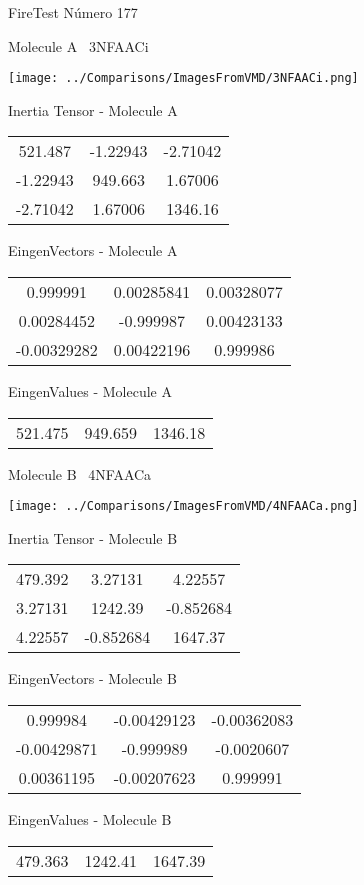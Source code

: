 \vtab[-3cm]
\begin{center}
{\large FireTest \tab Número 177}
\end{center}
\begin{multicols}{2}
\begin{center}

Molecule A \
3NFAACi

\texttt{[image: ../Comparisons/ImagesFromVMD/3NFAACi.png]}

Inertia Tensor - Molecule A \\
\begin{tabular}{|c c c|}
521.487	 & 	-1.22943	 & 	-2.71042	 \\
-1.22943	 & 	949.663	 & 	1.67006	 \\
-2.71042	 & 	1.67006	 & 	1346.16
\end{tabular}

\vtab
 EingenVectors - Molecule A     \\
\begin{tabular}{|c c c|}
0.999991	 & 	0.00285841	 & 	0.00328077	 \\
0.00284452	 & 	-0.999987	 & 	0.00423133	 \\
-0.00329282	 & 	0.00422196	 & 	0.999986
\end{tabular}

\vtab
 EingenValues - Molecule A     \\
\begin{tabular}{|c c c|}
521.475	 & 	949.659	 & 	1346.18	 \\
\end{tabular}
\columnbreak

Molecule B \
4NFAACa

\texttt{[image: ../Comparisons/ImagesFromVMD/4NFAACa.png]}

Inertia Tensor - Molecule B \\
\begin{tabular}{|c c c|}
479.392	 & 	3.27131	 & 	4.22557	 \\
3.27131	 & 	1242.39	 & 	-0.852684	 \\
4.22557	 & 	-0.852684	 & 	1647.37
\end{tabular}

\vtab
 EingenVectors - Molecule B     \\
\begin{tabular}{|c c c|}
0.999984	 & 	-0.00429123	 & 	-0.00362083	 \\
-0.00429871	 & 	-0.999989	 & 	-0.0020607	 \\
0.00361195	 & 	-0.00207623	 & 	0.999991
\end{tabular}

\vtab
 EingenValues - Molecule B     \\
\begin{tabular}{|c c c|}
479.363	 & 	1242.41	 & 	1647.39	 \\
\end{tabular}

\end{center}
\end{multicols}

